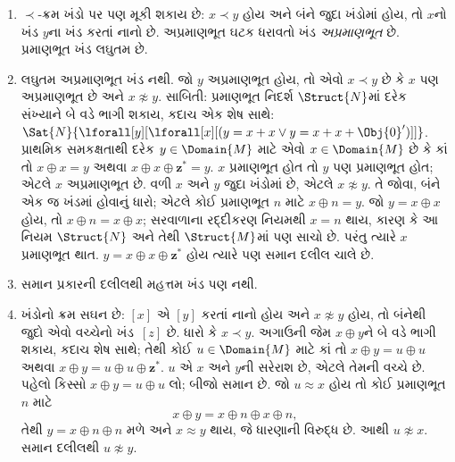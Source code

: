 \begin{enumerate}
  થાય; તેથી $x^* \prec
  y$. એ જ રીતે,
  જો $x \prec y$
  અને $x \not\approx y$
  હોય, તો $x \prec
  {^*y}$. તેથી
  $x \prec y$ અને
  $x \not\approx y$
  હોય તો દરેક
  $w \approx x$ એ
  દરેક $v \approx y$
  કરતાં $\prec$-નાનો છે.
  તદનુસાર, દરેક
  અપ્રમાણભૂત ખંડ~$[x]$
  નીચે જેવી બંને
  દિશાએ અનંત સાંકળ
  બનાવે છે:
  \[
  \cdots \prec  {^{**}x} \prec {^*}x \prec x \prec x^* \prec x^{**}
  \prec \cdots
  \]
  પૂર્ણાંકો જેવો ક્રમપ્રકાર
  હોવાથી તેને $Z$-સાંકળ
  કહે છે.
\item $\prec$-ક્રમ ખંડો
  પર પણ મૂકી શકાય છે:
  $x \prec y$ હોય અને
  બંને જુદા ખંડોમાં
  હોય, તો $x$નો
  ખંડ $y$ના ખંડ
  કરતાં નાનો છે.
  અપ્રમાણભૂત ઘટક
  ધરાવતો ખંડ
  \emph{અપ્રમાણભૂત}
  છે. પ્રમાણભૂત
  ખંડ લઘુતમ છે.
\item લઘુતમ અપ્રમાણભૂત
  ખંડ નથી. જો $y$
  અપ્રમાણભૂત હોય,
  તો એવો $x \prec y$
  છે કે $x$ પણ
  અપ્રમાણભૂત છે અને
  $x \not\approx y$.
  સાબિતી: પ્રમાણભૂત
  નિદર્શ $\Struct{N}$માં
  દરેક સંખ્યાને
  બે વડે ભાગી શકાય,
  કદાચ એક શેષ સાથે:
  $\Sat{N}{\lforall[y][\lforall[x][(y = x + x \lor y = x + x +
        \Obj{0}')]]}$.
  પ્રાથમિક સમકક્ષતાથી
  દરેક $y \in
  \Domain{M}$ માટે
  એવો $x \in
  \Domain{M}$ છે કે
  કાં તો $x \oplus x
  = y$ અથવા
  $x \oplus x \oplus
  \mathbf{z}^*= y$.
  $x$ પ્રમાણભૂત
  હોત તો $y$
  પણ પ્રમાણભૂત
  હોત; એટલે
  $x$ અપ્રમાણભૂત છે.
  વળી $x$ અને
  $y$ જુદા ખંડોમાં
  છે, એટલે
  $x \not\approx y$.
  તે જોવા, બંને
  એક જ ખંડમાં
  હોવાનું ધારો;
  એટલે કોઈ
  પ્રમાણભૂત $n$
  માટે $x \oplus n =
  y$. જો $y = x
  \oplus x$ હોય,
  તો $x \oplus n =
  x \oplus x$;
  સરવાળાના રદ્દીકરણ
  નિયમથી $x = n$
  થાય, કારણ કે
  આ નિયમ $\Struct{N}$
  અને તેથી
  $\Struct{M}$માં
  પણ સાચો છે.
  પરંતુ ત્યારે
  $x$ પ્રમાણભૂત
  થાત. $y = x
  \oplus x \oplus
  \mathbf{z}^*$ હોય
  ત્યારે પણ
  સમાન દલીલ ચાલે છે.
\item સમાન પ્રકારની
  દલીલથી મહત્તમ
  ખંડ પણ નથી.
\item ખંડોનો ક્રમ
  સઘન છે: $[x]$
  એ $[y]$ કરતાં
  નાનો હોય અને
  $x \not\approx y$
  હોય, તો બંનેથી
  જુદો એવો વચ્ચેનો
  ખંડ~$[z]$ છે.
  ધારો કે $x \prec
  y$. અગાઉની જેમ
  $x \oplus y$ને
  બે વડે ભાગી
  શકાય, કદાચ
  શેષ સાથે;
  તેથી કોઈ $u
  \in \Domain{M}$
  માટે કાં તો
  $x \oplus y =
  u \oplus u$
  અથવા $x \oplus
  y = u \oplus u
  \oplus \mathbf{z}^*$.
  $u$ એ $x$
  અને $y$ની
  સરેરાશ છે,
  એટલે તેમની
  વચ્ચે છે. પહેલો
  કિસ્સો $x \oplus
  y = u \oplus u$
  લો; બીજો
  સમાન છે. જો
  $u \approx x$
  હોય તો કોઈ
  પ્રમાણભૂત $n$
  માટે
  \[
  x \oplus y = x \oplus n \oplus x \oplus n,
  \]
  તેથી $y = x
  \oplus n \oplus n$
  મળે અને
  $x \approx y$
  થાય, જે
  ધારણાની વિરુદ્ધ
  છે. આથી
  $u \not\approx x$.
  સમાન દલીલથી
  $u \not\approx y$.
\end{enumerate}
